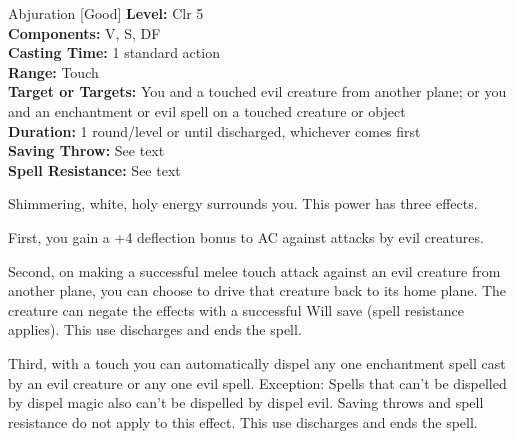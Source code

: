 {Abjuration [Good]}
{
	\textbf{Level:}
	Clr 5\\
	\textbf{Components:}
	V, S, DF\\
	\textbf{Casting Time:}
	1 standard action\\
	\textbf{Range:}
	Touch\\
	\textbf{Target or Targets:}
	You and a touched evil creature from another plane; or you and an enchantment or evil spell on a touched creature or object\\
	\textbf{Duration:}
	1 round/level or until discharged, whichever comes first\\
	\textbf{Saving Throw:}
	See text\\
	\textbf{Spell Resistance:}
	See text\\
}
{
	Shimmering, white, holy energy surrounds you. This power has three effects.

	First, you gain a +4 deflection bonus to AC against attacks by evil creatures.

	Second, on making a successful melee touch attack against an evil creature from another plane, you can choose to drive that creature back to its home plane. The creature can negate the effects with a successful Will save (spell resistance applies). This use discharges and ends the spell.

	Third, with a touch you can automatically dispel any one enchantment spell cast by an evil creature or any one evil spell. Exception: Spells that can't be dispelled by dispel magic also can't be dispelled by dispel evil. Saving throws and spell resistance do not apply to this effect. This use discharges and ends the spell.

}
